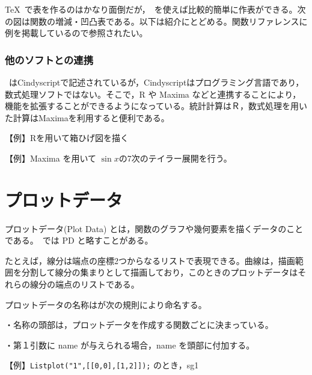 \documentclass[papersize,a4paper,12pt,uplatex]{jsarticle}
\begin{document}
\TeX\ で表を作るのはかなり面倒だが，\ketcindy\ を使えば比較的簡単に作表ができる。次の図は関数の増減・凹凸表である。以下は紹介にとどめる。関数リファレンスに例を掲載しているので参照されたい。

\begin{center}  \end{center}


\subsubsection{他のソフトとの連携}

\ketcindy\ はCindyscriptで記述されているが，Cindyscriptはプログラミング言語であり，数式処理ソフトではない。そこで，R や Maxima などと連携することにより，機能を拡張することができるようになっている。統計計算はＲ，数式処理を用いた計算はMaximaを利用すると便利である。

【例】Rを用いて箱ひげ図を描く

 \begin{center}\scalebox{0.8}{  } \end{center}
 
          
【例】Maxima を用いて $ \sin x $の7次のテイラー展開を行う。
 
 \begin{center}\scalebox{0.8}{ } \end{center}

\newpage
\section{プロットデータ} 
プロットデータ(Plot Data) とは，関数のグラフや幾何要素を描くデータのことである。\ketcindy\ では PD と略すことがある。

たとえば，線分は端点の座標2つからなるリストで表現できる。曲線は，描画範囲を分割して線分の集まりとして描画しており，このときのプロットデータはそれらの線分の端点のリストである。

プロットデータの名称は\ketcindy が次の規則により命名する。

\vspace{\baselineskip}
・名称の頭部は，プロットデータを作成する関数ごとに決まっている。

・第１引数に name が与えられる場合，name を頭部に付加する。

\hspace{10mm} 【例】\verb|Listplot("1",[[0,0],[1,2]]);|  のとき，sg1
      
\end{document}
